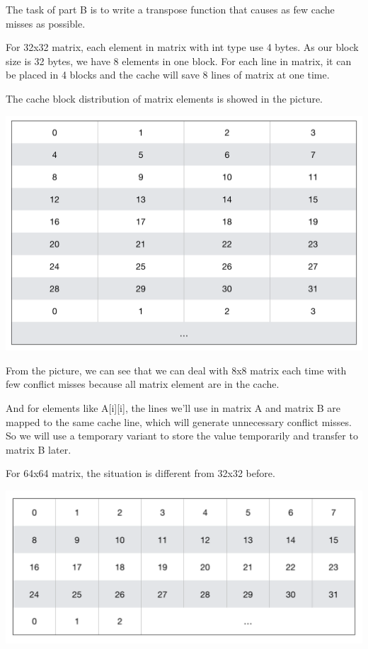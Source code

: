 \documentclass{article}
\begin{document}
The task of part B is to write a transpose function that causes as few cache misses as possible. 

For 32x32 matrix, each element in matrix with int type use 4 bytes. As our block size is 32 bytes, we have 
8 elements in one block. For each line in matrix, it can be placed in 4 blocks and the cache will save 8 lines of matrix at one time.

The cache block distribution of matrix elements is showed in the picture.

\includegraphics[scale=0.35]{2.png}

From the picture, we can see that we can deal with 8x8 matrix each time with few conflict misses because all matrix element are in the cache.

And for elements like A[i][i], the lines we’ll use in matrix A and matrix B are mapped to the same cache line, which will generate unnecessary conflict misses. So we will use a temporary variant to store the value temporarily and transfer to matrix B later.

For 64x64 matrix, the situation is different from 32x32 before. 

\includegraphics[scale=0.35]{3.png}
\end{document}
